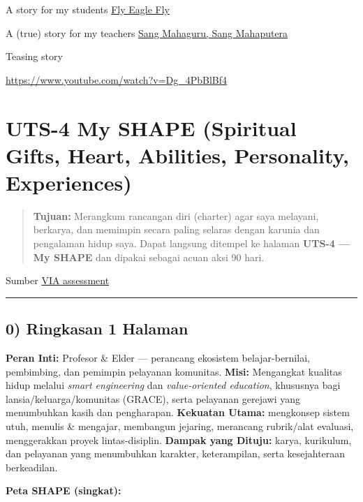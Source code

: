 \documentclass[
  letterpaper,
  DIV=11,
  numbers=noendperiod]{scrreprt}
\begin{document}
A story for my students
\href{https://azrl.wordpress.com/2008/04/21/fly-my-eagle-fly/}{Fly Eagle
Fly}

A (true) story for my teachers
\href{\%3Chttps://azrl.wordpress.com/2012/11/28/perginya-sang-mahaputera-dan-mahaguru-berkemeja-putih/}{Sang
Mahaguru, Sang Mahaputera}

Teasing story

\url{https://www.youtube.com/watch?v=Dg_4PbBlBf4}


\chapter{UTS-4 My SHAPE (Spiritual Gifts, Heart, Abilities, Personality,
Experiences)}\label{uts-4-my-shape-spiritual-gifts-heart-abilities-personality-experiences}

\begin{quote}
\textbf{Tujuan:} Merangkum rancangan diri (charter) agar saya melayani,
berkarya, dan memimpin secara paling selaras dengan karunia dan
pengalaman hidup saya. Dapat langsung ditempel ke halaman \textbf{UTS-4
--- My SHAPE} dan dipakai sebagai acuan aksi 90 hari.
\end{quote}

Sumber \href{StrengthsProfile-Armein-Langi.pdf}{VIA assessment}

\begin{center}\rule{0.5\linewidth}{0.5pt}\end{center}

\section{0) Ringkasan 1 Halaman}\label{ringkasan-1-halaman}

\textbf{Peran Inti:} Profesor \& Elder --- perancang ekosistem
belajar-bernilai, pembimbing, dan pemimpin pelayanan komunitas.
\textbf{Misi:} Mengangkat kualitas hidup melalui \emph{smart
engineering} dan \emph{value-oriented education}, khususnya bagi
lansia/keluarga/komunitas (GRACE), serta pelayanan gerejawi yang
menumbuhkan kasih dan pengharapan. \textbf{Kekuatan Utama:} mengkonsep
sistem utuh, menulis \& mengajar, membangun jejaring, merancang
rubrik/alat evaluasi, menggerakkan proyek lintas-disiplin.
\textbf{Dampak yang Dituju:} karya, kurikulum, dan pelayanan yang
menumbuhkan karakter, keterampilan, serta kesejahteraan berkeadilan.

\textbf{Peta SHAPE (singkat):}
\end{document}
